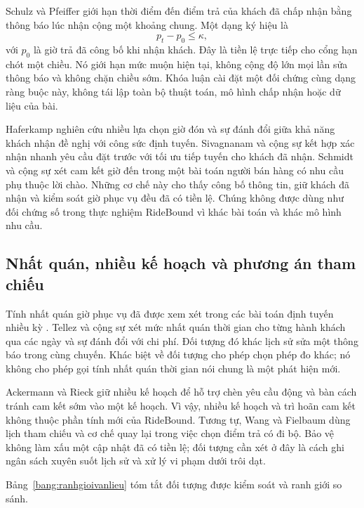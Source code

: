 Schulz và Pfeiffer \cite{schulz2026} giới hạn thời điểm đến điểm trả của khách đã
chấp nhận bằng thông báo lúc nhận cộng một khoảng chung. Một dạng ký hiệu là
\begin{equation}
p_t-p_0\leq\kappa,
\end{equation}
với $p_0$ là giờ trả đã công bố khi nhận khách. Đây là tiền lệ trực tiếp cho cổng
hạn chót một chiều. Nó giới hạn mức muộn hiện tại, không cộng độ lớn mọi lần sửa
thông báo và không chặn chiều sớm. Khóa luận cài đặt một đối chứng cùng dạng ràng
buộc này, không tái lập toàn bộ thuật toán, mô hình chấp nhận hoặc dữ liệu của bài.

Haferkamp \cite{haferkamp2024} nghiên cứu nhiều lựa chọn giờ đón và sự đánh đổi giữa
khả năng khách nhận đề nghị với công sức định tuyến. Sivagnanam và cộng sự
\cite{sivagnanam2026} kết hợp xác nhận nhanh yêu cầu đặt trước với tối ưu tiếp tuyến
cho khách đã nhận. Schmidt và cộng sự \cite{schmidt2026} xét cam kết giờ đến trong
một bài toán người bán hàng có nhu cầu phụ thuộc lời chào. Những cơ chế này cho thấy
công bố thông tin, giữ khách đã nhận và kiểm soát giờ phục vụ đều đã có tiền lệ.
Chúng không được dùng như đối chứng số trong thực nghiệm RideBound vì khác bài toán
và khác mô hình nhu cầu.

\subsection{Nhất quán, nhiều kế hoạch và phương án tham chiếu}

Tính nhất quán giờ phục vụ đã được xem xét trong các bài toán định tuyến nhiều kỳ
\cite{kovacs2014}. Tellez và cộng sự \cite{tellez2022} xét mức nhất quán thời gian
cho từng hành khách qua các ngày và sự đánh đổi với chi phí. Đối tượng đó khác lịch
sử sửa một thông báo trong cùng chuyến. Khác biệt về đối tượng cho phép chọn phép
đo khác; nó không cho phép gọi tính nhất quán thời gian nói chung là một phát hiện mới.

Ackermann và Rieck \cite{ackermann2025} giữ nhiều kế hoạch để hỗ trợ chèn yêu cầu động
và bàn cách tránh cam kết sớm vào một kế hoạch. Vì vậy, nhiều kế hoạch và trì hoãn cam
kết không thuộc phần tính mới của RideBound. Tương tự, Wang và Fielbaum
\cite{wang2026walking} dùng lịch tham chiếu và cơ chế quay lại trong việc chọn điểm
trả có đi bộ. Bảo vệ không làm xấu một cập nhật đã có tiền lệ; đối tượng cần xét ở
đây là cách ghi ngân sách xuyên suốt lịch sử và xử lý vi phạm dưới trôi dạt.

Bảng~\ref{bang:ranhgioivanlieu} tóm tắt đối tượng được kiểm soát và ranh giới so sánh.

